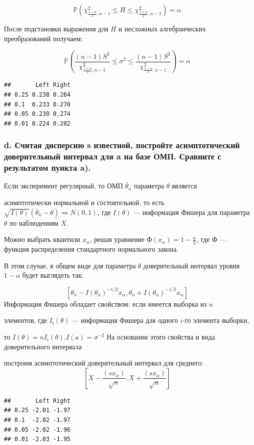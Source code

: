 \documentclass[]{article}
\begin{document}
\[ \mathbb {P} \left(\chi _{{\frac {1-\alpha }{2}},n-1}^{2}\leqslant H\leqslant \chi _{{\frac {1+\alpha }{2}},n-1}^{2}\right)=\alpha\]

После подстановки выражения для \(H\) и несложных алгебраических
преобразований получаем:

\[ \mathbb {P} \left({\frac {(n-1)S^{2}}{\chi _{{\frac {1+\alpha }{2}},n-1}^{2}}}\leqslant \sigma ^{2}\leqslant {\frac {(n-1)S^{2}}{\chi _{{\frac {1-\alpha }{2}},n-1}^{2}}}\right)=\alpha\]

\begin{verbatim}
##       Left Right
## 0.25 0.238 0.264
## 0.1  0.233 0.270
## 0.05 0.230 0.274
## 0.01 0.224 0.282
\end{verbatim}

\subsubsection{d. Считая дисперсию s известной, постройте
асимптотический доверительный интервал для a на базе ОМП. Сравните с
результатом пункта a).}\label{d.---s-------a---.-----a.}

Если эксперимент регулярный, то ОМП \(\bar θ_n\) параметра \(θ\)
является

асимптотически нормальной и состоятельной, то есть
\(\sqrt{I(θ)}(\bar θ_n − θ)⇒ N(0,1)\), где \(I(θ)\) --- информация
Фишера для параметра \(θ\) по наблюдениям \(X\).

Можно выбрать квантили \(x_α\), решая уравнение
\(Ф(x_α) = 1- \frac {α}{2}\), где \(Ф\) --- функция распределения
стандартного нормального закона.

В этом случае, в общем виде для параметра \(θ\) доверительный интервал
уровня \(1-α\) будет выглядеть так:

\[[ θ_n − I( θ_n)^{−1 /2} x_{\alpha} , θ_n + I( θ_n)^{−1 /2} x_{\alpha}]\]
Информация Фишера обладает свойством: если имеется выборка из \(n\)

элементов, где \(I_i(θ)\) --- информация Фишера для одного \(i\)-го
элемента выборки,

то \(I(θ)=nI_i(θ)\).\(I(a) = σ^{−2}\) На основании этого свойства и вида
доверительного интервала

построим асимптотический доверительный интервал для среднего:
\[[X−\frac {(sx_α)}{\sqrt n}, X+\frac {(sx_α)}{\sqrt n} ]\]

\begin{verbatim}
##       Left Right
## 0.25 -2.01 -1.97
## 0.1  -2.02 -1.97
## 0.05 -2.02 -1.96
## 0.01 -2.03 -1.95
\end{verbatim}
\end{document}
